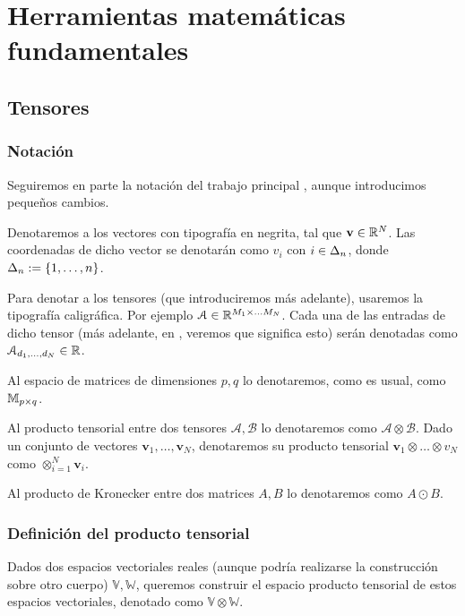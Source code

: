 \chapter{Herramientas matemáticas fundamentales}

\section{Tensores}

\subsection{Notación}

Seguiremos en parte la notación del trabajo principal \cite{matematicas:principal}, aunque introducimos pequeños cambios.

Denotaremos a los vectores con tipografía en negrita, tal que $\mathbf{v} \in \mathbb{R}^N$. Las coordenadas de dicho vector se denotarán como $v_i$ con $i \in \Delta_{n}$, donde $\Delta_{n} := \{1, \ldots, n\}$.

Para denotar a los tensores (que introduciremos más adelante), usaremos la tipografía caligráfica. Por ejemplo $\mathcal{A} \in \mathbb{R}^{M_1 \times \ldots M_N}$. Cada una de las entradas de dicho tensor (más adelante, en , veremos que significa esto) serán denotadas como $\mathcal{A}_{d_1, \ldots, d_N} \in \mathbb{R}$.

Al espacio de matrices de dimensiones $p, q$ lo denotaremos, como es usual, como $\mathbb{M}_{p \times q}$.

Al producto tensorial entre dos tensores $\mathcal{A}, \mathcal{B}$ lo denotaremos como $\mathcal{A} \otimes \mathcal{B}$. Dado un conjunto de vectores $\mathbf{v}_1, \ldots, \mathbf{v}_N$, denotaremos su producto tensorial $\mathbf{v}_1 \otimes \ldots \otimes {v}_N$ como $\otimes_{i = 1}^N \mathbf{v}_i$.

Al producto de Kronecker entre dos matrices $A, B$ lo denotaremos como $A \odot B$.

\subsection{Definición del producto tensorial} \label{sec:deftensor}

Dados dos espacios vectoriales reales (aunque podría realizarse la construcción sobre otro cuerpo) $\mathbb{V}, \mathbb{W}$, queremos construir el espacio producto tensorial de estos espacios vectoriales, denotado como $\mathbb{V} \otimes \mathbb{W}$.

